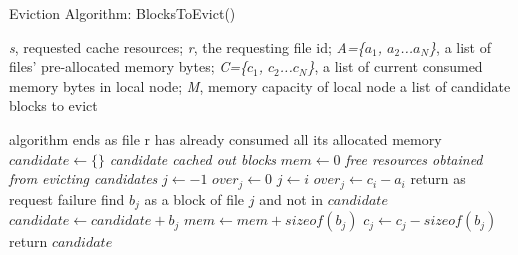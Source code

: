 
\begin{algorithm}[!htb]
	\caption{Eviction Algorithm: BlocksToEvict()}
	\label{worker algorithm}
	\begin{algorithmic}[1]
		\Require \emph{s}, requested cache resources; \emph{r}, the requesting file id; \emph{A=\{$a_1$, $a_2$...$a_N$\}}, a list of files' pre-allocated memory bytes; \emph{C=\{$c_1$, $c_2$...$c_N$\}}, a list of current consumed memory bytes in local node; \emph{M}, memory capacity of local node
		\Ensure a list of candidate blocks to evict
			
			\State algorithm ends as file r has already consumed all its allocated memory
		\EndIf
		\State $candidate \gets \{\}$ \Comment \textit{candidate cached out blocks}
		\State $mem \gets 0$ \Comment \textit{free resources obtained from evicting candidates}
		\State $j \gets -1$
		\State $over_j \gets 0$
				\State $j \gets i$
				\State $over_j \gets c_i - a_i$
			\EndIf
		\EndFor
			\State return as request failure
		\EndIf
		\State find $b_j$ as a block of file $j$ and not in $candidate$
		\State $candidate \gets candidate + b_j$
		\State $mem \gets mem + size of (b_j)$
		\State $c_j \gets c_j - sizeof(b_j)$
			\State return $candidate$
		\EndIf
		\EndWhile
		
	\end{algorithmic}
\end{algorithm}



